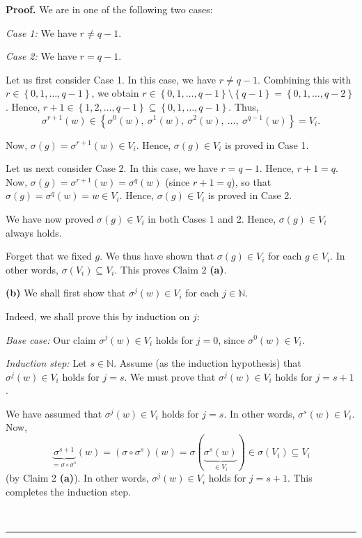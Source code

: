 \documentclass[numbers=enddot,12pt,final,onecolumn,notitlepage]{scrartcl}%
\numberwithin{exer}{section}
\theoremstyle{definition}
\newenvironment{proof}[1][Proof]{\noindent\textbf{#1.} }{\ \rule{0.5em}{0.5em}}
\newenvironment{verlong}{}{}
\begin{document}
\begin{verlong}
\begin{proof}
We are in one of the following two cases:

\textit{Case 1:} We have $r\neq q-1$.

\textit{Case 2:} We have $r=q-1$.

Let us first consider Case 1. In this case, we have $r\neq q-1$. Combining
this with $r\in\left\{  0,1,\ldots,q-1\right\}  $, we obtain $r\in\left\{
0,1,\ldots,q-1\right\}  \setminus\left\{  q-1\right\}  =\left\{
0,1,\ldots,q-2\right\}  $. Hence, $r+1\in\left\{  1,2,\ldots,q-1\right\}
\subseteq\left\{  0,1,\ldots,q-1\right\}  $. Thus,
\[
\sigma^{r+1}\left(  w\right)  \in\left\{  \sigma^{0}\left(  w\right)
,\ \sigma^{1}\left(  w\right)  ,\ \sigma^{2}\left(  w\right)  ,\ \ldots
,\ \sigma^{q-1}\left(  w\right)  \right\}  =V_{i}.
\]


Now, $\sigma\left(  g\right)  =\sigma^{r+1}\left(  w\right)  \in V_{i}$.
Hence, $\sigma\left(  g\right)  \in V_{i}$ is proved in Case 1.

Let us next consider Case 2. In this case, we have $r=q-1$. Hence, $r+1=q$.
Now, $\sigma\left(  g\right)  =\sigma^{r+1}\left(  w\right)  =\sigma
^{q}\left(  w\right)  $ (since $r+1=q$), so that $\sigma\left(  g\right)
=\sigma^{q}\left(  w\right)  =w\in V_{i}$. Hence, $\sigma\left(  g\right)  \in
V_{i}$ is proved in Case 2.

We have now proved $\sigma\left(  g\right)  \in V_{i}$ in both Cases 1 and 2.
Hence, $\sigma\left(  g\right)  \in V_{i}$ always holds.

Forget that we fixed $g$. We thus have shown that $\sigma\left(  g\right)  \in
V_{i}$ for each $g\in V_{i}$. In other words, $\sigma\left(  V_{i}\right)
\subseteq V_{i}$. This proves Claim 2 \textbf{(a)}.

\textbf{(b)} We shall first show that $\sigma^{j}\left(  w\right)  \in V_{i}$
for each $j\in\mathbb{N}$.

Indeed, we shall prove this by induction on $j$:

\textit{Base case:} Our claim $\sigma^{j}\left(  w\right)  \in V_{i}$ holds
for $j=0$, since $\sigma^{0}\left(  w\right)  \in V_{i}$.

\textit{Induction step:} Let $s\in\mathbb{N}$. Assume (as the induction
hypothesis) that $\sigma^{j}\left(  w\right)  \in V_{i}$ holds for $j=s$. We
must prove that $\sigma^{j}\left(  w\right)  \in V_{i}$ holds for $j=s+1$.

We have assumed that $\sigma^{j}\left(  w\right)  \in V_{i}$ holds for $j=s$.
In other words, $\sigma^{s}\left(  w\right)  \in V_{i}$. Now,
\[
\underbrace{\sigma^{s+1}}_{=\sigma\circ\sigma^{s}}\left(  w\right)  =\left(
\sigma\circ\sigma^{s}\right)  \left(  w\right)  =\sigma\left(
\underbrace{\sigma^{s}\left(  w\right)  }_{\in V_{i}}\right)  \in\sigma\left(
V_{i}\right)  \subseteq V_{i}%
\]
(by Claim 2 \textbf{(a)}). In other words, $\sigma^{j}\left(  w\right)  \in
V_{i}$ holds for $j=s+1$. This completes the induction step.


\end{proof}
\end{verlong}
\end{document}
